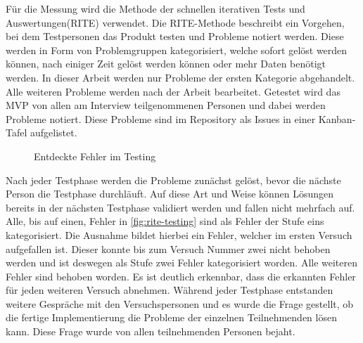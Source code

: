 Für die Messung wird die Methode der schnellen iterativen Tests und Auswertungen(\ac{RITE}) verwendet\cite{rite-method}.
Die \ac{RITE}-Methode beschreibt ein Vorgehen, bei dem Testpersonen das Produkt testen und Probleme notiert werden.
Diese werden in Form von Problemgruppen kategorisiert, welche sofort gelöst werden können, nach einiger Zeit gelöst werden können oder mehr Daten benötigt werden.
In dieser Arbeit werden nur Probleme der ersten Kategorie abgehandelt.
Alle weiteren Probleme werden nach der Arbeit bearbeitet.
Getestet wird das \ac{MVP} von allen am Interview teilgenommenen Personen und dabei werden Probleme notiert.
Diese Probleme sind im Repository als Issues in einer Kanban-Tafel aufgelistet.\\

\begin{figure}[H]
    \centering
    \caption{\label{fig:rite-testing}Entdeckte Fehler im Testing}
\end{figure}

Nach jeder Testphase werden die Probleme zunächst gelöst, bevor die nächste Person die Testphase durchläuft.
Auf diese Art und Weise können Lösungen bereits in der nächsten Testphase validiert werden und fallen nicht mehrfach auf.
Alle, bis auf einen, Fehler in \autoref{fig:rite-testing} sind als Fehler der Stufe eins kategorisiert.
Die Ausnahme bildet hierbei ein Fehler, welcher im ersten Versuch aufgefallen ist.
Dieser konnte bis zum Versuch Nummer zwei nicht behoben werden und ist deswegen als Stufe zwei Fehler kategorisiert worden.
Alle weiteren Fehler sind behoben worden. Es ist deutlich erkennbar, dass die erkannten Fehler für jeden weiteren Versuch abnehmen.
Während jeder Testphase entstanden weitere Gespräche mit den Versuchspersonen und es wurde die Frage gestellt, ob die fertige Implementierung die Probleme der einzelnen Teilnehmenden lösen kann.
Diese Frage wurde von allen teilnehmenden Personen bejaht.
